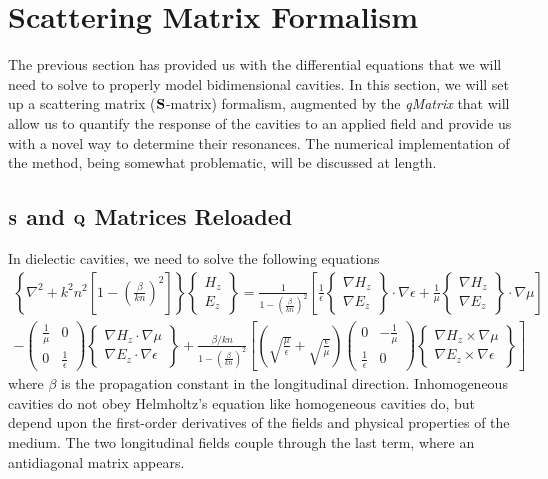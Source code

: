 \section{Scattering Matrix Formalism}
The previous section has provided us with the differential equations that 
we will need to solve to properly model bidimensional cavities. In this section, 
we will set up a scattering matrix ($\mathbf{S}$-matrix) formalism, augmented by the \textit{\gls{qMatrix}}
that will allow us to quantify the response of the cavities
to an applied field and provide us with a novel way to determine their resonances. 
The numerical implementation of the method, being somewhat problematic, will 
be discussed at length. 

\subsection{$\mathbf{S}$ and $\mathbf{Q}$ Matrices Reloaded}
In dielectic cavities, we need to solve the following equations
  \begin{multline}
    \left\{\nabla^2+k^2n^2\left[1-\left(\frac{\beta}{kn}\right)^2\right]\right\}\begin{Bmatrix} H_z \\ E_z \end{Bmatrix}
      = \frac{1}{1-\left(\frac{\beta}{kn}\right)^2}
	  \left[\frac{1}{\epsilon}\begin{Bmatrix} \nabla H_z \\ \nabla E_z \end{Bmatrix}\cdot\nabla\epsilon+\frac{1}{\mu}\begin{Bmatrix} \nabla  H_z \\ \nabla E_z \end{Bmatrix}\cdot\nabla\mu\right]
      \\-\begin{pmatrix} \frac{1}{\mu} & 0 \\ 0 &\frac{1}{\epsilon}\end{pmatrix} \begin{Bmatrix} \nabla H_z \cdot\nabla\mu \\ \nabla E_z\cdot\nabla\epsilon \end{Bmatrix}
      +\frac{\beta/kn}{1-\left(\frac{\beta}{kn}\right)^2}\left[\left(\sqrt{\frac{\mu}{\epsilon}}+\sqrt{\frac{\epsilon}{\mu}}\right)\begin{pmatrix}0 & -\frac{1}{\mu}\\\frac{1}{\epsilon} & 0\end{pmatrix}
      \begin{Bmatrix} \nabla H_z\times\nabla\mu \\ \nabla E_z\times\nabla\epsilon\end{Bmatrix}\right]
  \end{multline}
where $\beta$ is the propagation constant in the longitudinal direction.
Inhomogeneous cavities do not obey Helmholtz's equation like homogeneous
cavities do, but depend upon the first-order derivatives of the fields and 
physical properties of the medium. The two longitudinal fields
couple through the last term, where an antidiagonal matrix appears.

